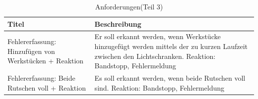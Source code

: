 \documentclass[a4paper, 11pt]{article}
\begin{document}
\newpage

\begin{table}[h]
\center
\begin{tabularx}{\textwidth}{|X|X|}
\hline
\textbf{Titel}&\textbf{Beschreibung}\\
\hline
Fehlererfassung: Hinzufügen von Werkstücken + Reaktion&Er soll erkannt werden, wenn Werkstücke hinzugefügt werden mittels der zu kurzen Laufzeit zwischen den Lichtschranken. Reaktion: Bandstopp, Fehlermeldung \\
\hline
Fehlererfassung: Beide Rutschen voll + Reaktion&Es soll erkannt werden, wenn beide Rutschen voll sind. Reaktion: Bandstopp, Fehlermeldung \\
\hline
\end{tabularx}
\caption{Anforderungen(Teil 3)}
\label{anf3}
\end{table}
\end{document}
